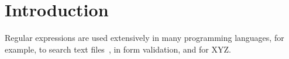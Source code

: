 \section{Introduction}

Regular expressions are used extensively in many programming languages, for example, to search text files~\cite{Clarke:1997:URE:256167.256174}, in form validation, and for XYZ. 
